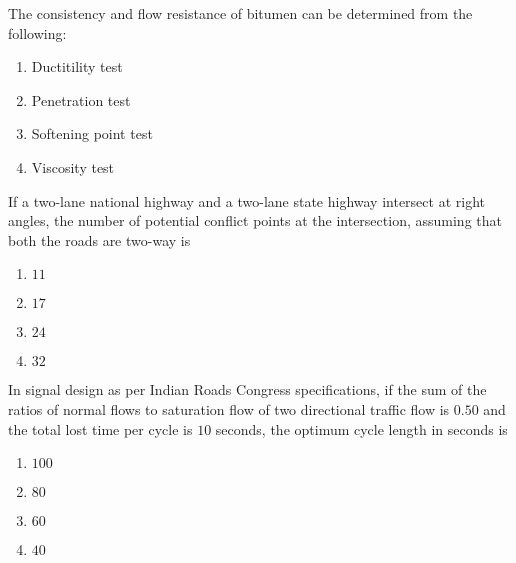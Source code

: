 \iffalse
\chapter{2007}
\author{AI24BTECH11020}
\section{ce}
\fi

	\item The consistency and flow resistance of bitumen can be determined from the following:
	\begin{enumerate}
		\item Ductitility test
		\item Penetration test
		\item Softening point test
		\item Viscosity test
	\end{enumerate}
\item If a two-lane national highway and a two-lane state highway intersect at right angles, the number of potential conflict points at the intersection, assuming that both the roads are two-way is 
	\begin{enumerate}
                \item $11$
                \item $17$
		\item $24$
                \item $32$
        \end{enumerate}
\item In signal design as per Indian Roads Congress specifications, if the sum of the ratios of normal flows to saturation flow of two directional traffic flow is $0.50$ and the total lost time per cycle is $10$ seconds, the optimum cycle length in seconds is 
	\begin{enumerate}
                \item $100$
                \item $80$
                \item $60$
                \item $40$
        \end{enumerate}
